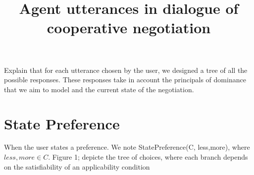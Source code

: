 \documentclass{llncs}
\begin{document}
\title{Agent utterances in dialogue of cooperative negotiation}
\maketitle 
Explain that for each utterance chosen by the user, we designed a tree of all the possible responses. These responses take in account the principals of dominance that we aim to model and the current state of the negotiation.
\section{State Preference}

When the user states a preference. We note StatePreference(C, less,more), where $less, more \in C$. Figure 1; depicte the tree of choices, where each branch depends on the satisfiability of an applicability condition
\end{document}
